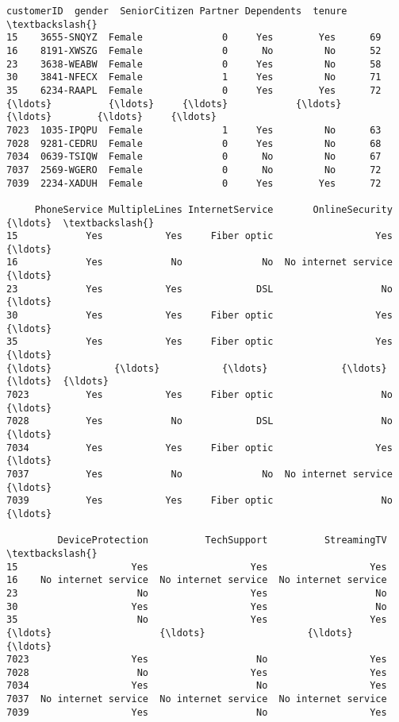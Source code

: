 \documentclass[11pt]{article}
\makeatletter
\newcommand{\boxspacing}{\kern\kvtcb@left@rule\kern\kvtcb@boxsep}
\newcommand{\prompt}[4]{
        {\ttfamily\llap{{\color{#2}[#3]:\hspace{3pt}#4}}\vspace{-\baselineskip}}
    }
\makeatother
\begin{document}
            \begin{tcolorbox}[breakable, size=fbox, boxrule=.5pt, pad at break*=1mm, opacityfill=0]
\prompt{Out}{outcolor}{11}{\boxspacing}
\begin{Verbatim}[commandchars=\\\{\}]
      customerID  gender  SeniorCitizen Partner Dependents  tenure  \textbackslash{}
15    3655-SNQYZ  Female              0     Yes        Yes      69
16    8191-XWSZG  Female              0      No         No      52
23    3638-WEABW  Female              0     Yes         No      58
30    3841-NFECX  Female              1     Yes         No      71
35    6234-RAAPL  Female              0     Yes        Yes      72
{\ldots}          {\ldots}     {\ldots}            {\ldots}     {\ldots}        {\ldots}     {\ldots}
7023  1035-IPQPU  Female              1     Yes         No      63
7028  9281-CEDRU  Female              0     Yes         No      68
7034  0639-TSIQW  Female              0      No         No      67
7037  2569-WGERO  Female              0      No         No      72
7039  2234-XADUH  Female              0     Yes        Yes      72

     PhoneService MultipleLines InternetService       OnlineSecurity  {\ldots}  \textbackslash{}
15            Yes           Yes     Fiber optic                  Yes  {\ldots}
16            Yes            No              No  No internet service  {\ldots}
23            Yes           Yes             DSL                   No  {\ldots}
30            Yes           Yes     Fiber optic                  Yes  {\ldots}
35            Yes           Yes     Fiber optic                  Yes  {\ldots}
{\ldots}           {\ldots}           {\ldots}             {\ldots}                  {\ldots}  {\ldots}
7023          Yes           Yes     Fiber optic                   No  {\ldots}
7028          Yes            No             DSL                   No  {\ldots}
7034          Yes           Yes     Fiber optic                  Yes  {\ldots}
7037          Yes            No              No  No internet service  {\ldots}
7039          Yes           Yes     Fiber optic                   No  {\ldots}

         DeviceProtection          TechSupport          StreamingTV  \textbackslash{}
15                    Yes                  Yes                  Yes
16    No internet service  No internet service  No internet service
23                     No                  Yes                   No
30                    Yes                  Yes                   No
35                     No                  Yes                  Yes
{\ldots}                   {\ldots}                  {\ldots}                  {\ldots}
7023                  Yes                   No                  Yes
7028                   No                  Yes                  Yes
7034                  Yes                   No                  Yes
7037  No internet service  No internet service  No internet service
7039                  Yes                   No                  Yes


\end{Verbatim}
\end{tcolorbox}
\end{document}
